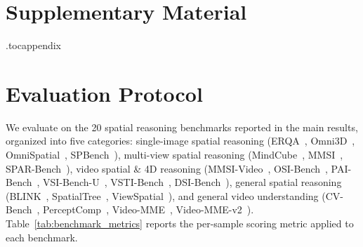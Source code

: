 \clearpage
\appendix

\section*{Supplementary Material}


\begingroup
\noindent
\vspace{0.6em}

\etocdepthtag.toc{appendix}
  {\setlength{\parindent}{0pt}\setlength{\parskip}{1pt}}
  {}
  {\noindent\makebox[1.6em][l]{\bfseries\etocnumber}\bfseries\etocname\dotfill\etocpage\par}
  {}
  {}
  {}
  {\noindent\hspace*{1.6em}{\normalfont\makebox[2.0em][l]{\etocnumber}\etocname}\dotfill\etocpage\par}
  {}
{\small\tableofcontents}
\endgroup
\clearpage











\section{Evaluation Protocol}
\label{app:benchmarks}

We evaluate \ours{} on the 20 spatial reasoning benchmarks reported in the main results, organized into five categories: single-image spatial reasoning (ERQA~\citep{team2025gemini}, Omni3D~\citep{marsili2025visual}, OmniSpatial~\citep{jia2025omnispatial}, SPBench~\citep{xu2025spbench}), multi-view spatial reasoning (MindCube~\citep{yin2025mindcube}, MMSI~\citep{yang2025mmsi}, SPAR-Bench~\citep{zhang2025from}), video spatial \& 4D reasoning (MMSI-Video~\citep{lin2025mmsivideo}, OSI-Bench~\citep{wu2025osibench}, PAI-Bench~\citep{zhou2025paibench}, VSI-Bench-U~\citep{brown2025shortcuts}, VSTI-Bench~\citep{fan2025vlm}, DSI-Bench~\citep{zhang2025dsibench}), general spatial reasoning (BLINK~\citep{fu2024blink}, SpatialTree~\citep{xiao2025spatialtree}, ViewSpatial~\citep{li2025viewspatial}), and general video understanding (CV-Bench~\citep{zhu2025cvbench}, PerceptComp~\citep{li2026perceptioncomp}, Video-MME~\citep{fu2025video}, Video-MME-v2~\citep{videommev2_2026}). 
Table~\ref{tab:benchmark_metrics} reports the per-sample scoring metric applied to each benchmark.


